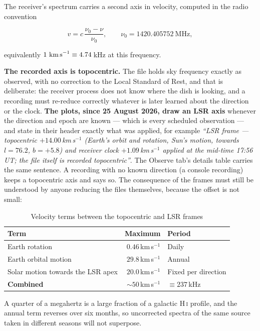 \documentclass[11pt,a4paper]{article}
\begin{document}
The receiver's spectrum carries a second axis in velocity, computed in the radio convention

\begin{equation}
v = c\,\frac{\nu_0 - \nu}{\nu_0}, \qquad \nu_0 = 1420.405752\ \text{MHz},
\end{equation}

equivalently $1\ \text{km\,s}^{-1} \equiv 4.74$\,kHz at this frequency.

\textbf{The recorded axis is topocentric.} The file holds sky frequency exactly as observed, with no correction to the Local Standard of Rest, and that is deliberate: the receiver process does not know where the dish is looking, and a recording must re-reduce correctly whatever is later learned about the direction or the clock. \textbf{The plots, since 25 August 2026, draw an LSR axis} whenever the direction and epoch are known --- which is every scheduled observation --- and state in their header exactly what was applied, for example \emph{``LSR frame --- topocentric $+14.00$\,km\,s$^{-1}$ (Earth's orbit and rotation, Sun's motion, towards $l=76.2$, $b=+5.8$) and receiver clock $+1.09$\,km\,s$^{-1}$ applied at the mid-time 17:56\,UT; the file itself is recorded topocentric''}. The Observe tab's details table carries the same sentence. A recording with no known direction (a console recording) keeps a topocentric axis and says so. The consequence of the frames must still be understood by anyone reducing the files themselves, because the offset is not small:

\begin{table}[H]
\centering
\caption{Velocity terms between the topocentric and LSR frames}
\label{tab:vframes}
\begin{tabular}{lrl}
\toprule
\textbf{Term} & \textbf{Maximum} & \textbf{Period} \\
\midrule
Earth rotation & $0.46$\,km\,s$^{-1}$ & Daily \\
Earth orbital motion & $29.8$\,km\,s$^{-1}$ & Annual \\
Solar motion towards the LSR apex & $20.0$\,km\,s$^{-1}$ & Fixed per direction \\
\midrule
\textbf{Combined} & $\sim50$\,km\,s$^{-1}$ & $\equiv 237$\,kHz \\
\bottomrule
\end{tabular}
\end{table}

A quarter of a megahertz is a large fraction of a galactic H\,\textsc{i} profile, and the annual term reverses over six months, so uncorrected spectra of the same source taken in different seasons will not superpose.
\end{document}
